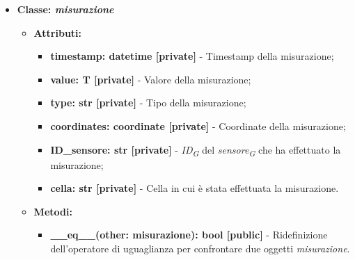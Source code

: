 \begin{itemize}
    \item\textbf{Classe: \textit{misurazione}}
    \begin{itemize}
        \item \textbf{Attributi:} 
    \begin{itemize}
        \item \textbf{timestamp: datetime [private]} - Timestamp della misurazione;
        \item \textbf{value: T [private]} - Valore della misurazione;
        \item \textbf{type: str [private]} - Tipo della misurazione;
        \item \textbf{coordinates: coordinate [private]} - Coordinate della misurazione;
        \item \textbf{ID\_sensore: str [private]} - \textit{ID}\textsubscript{\textit{G}} del \textit{sensore}\textsubscript{\textit{G}} che ha effettuato la misurazione;
        \item \textbf{cella: str [private]} - Cella in cui è stata effettuata la misurazione.
    \end{itemize}
    \item \textbf{Metodi:} 
    \begin{itemize}
        \item \textbf{\_\_eq\_\_(other: misurazione): bool [public]} - Ridefinizione dell'operatore di uguaglianza per confrontare due oggetti \textit{misurazione}.
    \end{itemize}
\end{itemize}


\end{itemize}

